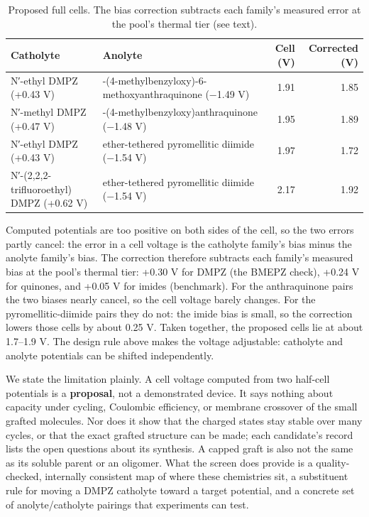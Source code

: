 \documentclass[journal=jcisd8,manuscript=article]{achemso}
\begin{document}
\begin{table}[htbp]
\caption{Proposed full cells. The bias correction subtracts each family's measured error at the pool's thermal tier (see text).}\label{tab:3}
\small
\begin{tabularx}{\textwidth}{@{}>{\raggedright\arraybackslash}X>{\raggedright\arraybackslash}Xrr@{}}
\hline
Catholyte & Anolyte & Cell (V) & Corrected (V) \\ \hline
N′-ethyl DMPZ (+0.43 V) & 2-\allowbreak{}(4-\allowbreak{}methylbenzyloxy)-\allowbreak{}6-\allowbreak{}methoxyanthra\-quinone (−1.49 V) & 1.91 & 1.85 \\
N′-methyl DMPZ (+0.47 V) & 1-\allowbreak{}(4-\allowbreak{}methylbenzyloxy)\allowbreak{}anthra\-quinone (−1.48 V) & 1.95 & 1.89 \\
N′-ethyl DMPZ (+0.43 V) & ether-\allowbreak{}tethered pyromellitic diimide (−1.54 V) & 1.97 & 1.72 \\
N′-(2,\allowbreak{}2,\allowbreak{}2-\allowbreak{}trifluoroethyl) DMPZ (+0.62 V) & ether-\allowbreak{}tethered pyromellitic diimide (−1.54 V) & 2.17 & 1.92 \\
\hline
\end{tabularx}
\end{table}

Computed potentials are too positive on both sides of the cell, so the two errors partly cancel: the error in a cell voltage is the catholyte family's bias minus the anolyte family's bias. The correction therefore subtracts each family's measured bias at the pool's thermal tier: +0.30 V for DMPZ (the BMEPZ check), +0.24 V for quinones, and +0.05 V for imides (benchmark). For the anthraquinone pairs the two biases nearly cancel, so the cell voltage barely changes. For the pyromellitic-diimide pairs they do not: the imide bias is small, so the correction lowers those cells by about 0.25 V. Taken together, the proposed cells lie at about 1.7–1.9 V. The design rule above makes the voltage adjustable: catholyte and anolyte potentials can be shifted independently.

We state the limitation plainly. A cell voltage computed from two half-cell potentials is a \textbf{proposal}, not a demonstrated device. It says nothing about capacity under cycling, Coulombic efficiency, or membrane crossover of the small grafted molecules. Nor does it show that the charged states stay stable over many cycles, or that the exact grafted structure can be made; each candidate's record lists the open questions about its synthesis. A capped graft is also not the same as its soluble parent or an oligomer. What the screen does provide is a quality-checked, internally consistent map of where these chemistries sit, a substituent rule for moving a DMPZ catholyte toward a target potential, and a concrete set of anolyte/catholyte pairings that experiments can test.
\end{document}

